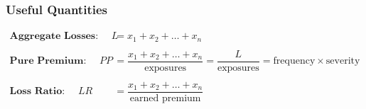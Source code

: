 \documentclass[
]{article}
\begin{document}
\begin{yellow}

\hypertarget{useful-quantities}{%
\subsubsection{Useful Quantities}\label{useful-quantities}}

\[
  \begin{align}
    \textbf{Aggregate Losses: } \quad L &= x_1+x_2+\dots+x_n \\ \\
    \textbf{Pure Premium: } \quad PP &= \dfrac{x_1+x_2+\dots+x_n}{\text{exposures}} = \dfrac{L}{\text{exposures}} = \text{frequency} \times \text{severity} \\ \\
    \textbf{Loss Ratio: } \quad LR &= \dfrac{x_1+x_2+\dots+x_n}{\text{earned premium}}
  \end{align}
\]

\end{yellow}
\end{document}
